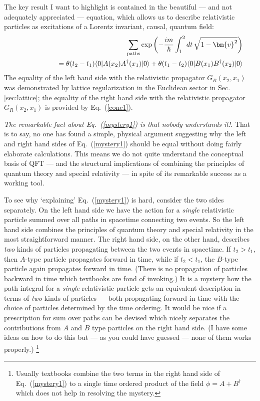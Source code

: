 \documentclass[12pt]{article}
\def\eq#1{{Eq.~(\ref{#1})}}
\def\bk#1#2#3{{\langle #1|#2|#3\rangle}}  %
\begin{document}
The key result I want to highlight is contained in the beautiful --- and not adequately appreciated --- equation, which allows us to describe  relativistic particles as excitations of a Lorentz invariant, causal, quantum field:
\begin{eqnarray}
 \label{mystery1}
 &&\sum_{\rm paths} \exp\left( - \frac{im}{\hbar} \int_1^2 dt\, \sqrt{1-\bm{v}^2} \right)\\
 &&\hskip5em= \theta(t_2-t_1) \bk{0}{A(x_2)A^\dagger(x_1)}{0} + \theta(t_1-t_2) \bk{0}{B(x_1)B^\dagger(x_2)}{0}\nonumber
\end{eqnarray} 
The equality of the left hand side with the relativistic propagator $G_R(x_2,x_1)$ was demonstrated by lattice regularization in the Euclidean sector in Sec. \ref{sec:lattice}; the equality of the right hand side with the relativistic propagator 
$G_R(x_2,x_1)$ is provided by \eq{conc1}. 

\textit{The remarkable fact about \eq{mystery1} is that nobody understands it!}. That is to say,  no one has found a simple, physical argument suggesting why the left and right hand sides of  \eq{mystery1} should be equal without doing fairly elaborate calculations. This means we do not quite understand the conceptual basis of QFT --- and the structural implications of combining the principles of quantum theory and special relativity --- in spite of its remarkable success as a working tool. 

To see why `explaining' \eq{mystery1} is hard, consider the two sides separately. On the left hand side we have the action for a \textit{single} relativistic particle summed over all paths in spacetime connecting two events. So the left hand side combines the principles of quantum theory and special relativity in the most straightforward manner. The right hand side, on the other hand, describes \textit{two} kinds of particles propagating between the two events in spacetime. If $t_2 > t_1$, then $A$-type particle propagates forward in time, while if $t_2<t_1$, the $B$-type particle again propagates forward in time. (There is no propagation of particles backward in time which textbooks are fond of invoking.) It is a mystery how the path integral for  a \textit{single} relativistic particle gets an equivalent description in terms of \textit{two} kinds of particles --- both propagating forward in time with the choice of particles determined by the time ordering. It would be nice if a prescription for sum over paths can be devised which  nicely separates the contributions from $A$ and $B$ type particles on the right hand side. (I have some ideas on how to do this but --- as you could have guessed --- none of them works properly.) 
\footnote{Usually textbooks combine the two terms in the right hand side of \eq{mystery1} to a single time ordered product of the field $\phi = A + B^\dagger$ which does not help in resolving the mystery.}
\end{document}
